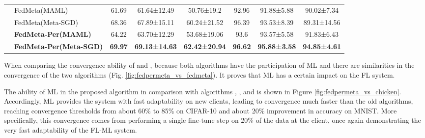 \documentclass[runningheads]{llncs}
\begin{document}
\begin{table}[h]
{\begin{tabular}{c|l|ccc|ccc}
                         & FedMeta(MAML)                                                                                                      & 61.69          & 61.64±12.49          & 50.76±19.2           & 92.96                             & 91.88±5.88                        & 90.02±7.34                         \\
                         & FedMeta(Meta-SGD)                                                                                                  & 68.36          & 67.89±15.11          & 60.24±21.52          & 96.39                             & 93.53±8.39                        & 89.31±14.56                         \\
                         & \textbf{\textbf{FedMeta-Per(MAML)}}                                                                                & 64.22          & 63.70±12.29          & 53.68±19.06          & 93.6                              & 93.57±5.58                        & 91.83±6.43                         \\
                         & \textbf{\textbf{FedMeta-Per(Meta-SGD)}}                                                                            & \textbf{69.97} & \textbf{69.13±14.63} & \textbf{62.42±20.94} & \textbf{96.62}                    & \textbf{95.88±3.58}               & \textbf{94.85±4.61}                 \\
    \bottomrule
    \end{tabular}
    }
\end{table}

When comparing the convergence ability of  and , because both algorithms have the participation of ML and there are similarities in the convergence of the two algorithms (Fig. \ref{fig:fedpermeta_vs_fedmeta}). It proves that ML has a certain impact on the FL system.

The ability of ML in the proposed algorithm in comparison with algorithms , ,  and  is shown in Figure \ref{fig:fedpermeta_vs_chicken}. Accordingly, ML provides the system with fast adaptability on new clients, leading to  convergence much faster than the old algorithms, reaching convergence thresholds from about 60\% to 85\% on CIFAR-10 and about 20\% improvement in accuracy on MNIST. More specifically, this convergence comes from performing a single fine-tune step on 20\% of the data at the client, once again demonstrating the very fast adaptability of the FL-ML system.
\end{document}
